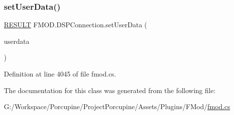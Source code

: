 \subsubsection{\texorpdfstring{set\+User\+Data()}{setUserData()}}
{\footnotesize\ttfamily \hyperlink{namespace_f_m_o_d_a305d1176ef3f8c8815861a60407ac33d}{R\+E\+S\+U\+LT} F\+M\+O\+D.\+D\+S\+P\+Connection.\+set\+User\+Data (\begin{DoxyParamCaption}\item[{Int\+Ptr}]{userdata }\end{DoxyParamCaption})}



Definition at line 4045 of file fmod.\+cs.



The documentation for this class was generated from the following file\+:\begin{DoxyCompactItemize}
\item 
G\+:/\+Workspace/\+Porcupine/\+Project\+Porcupine/\+Assets/\+Plugins/\+F\+Mod/\hyperlink{fmod_8cs}{fmod.\+cs}\end{DoxyCompactItemize}
